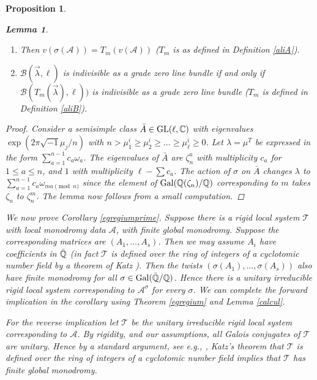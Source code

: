 \documentclass[11pt]{amsart}
\newcommand\op{\operatorname}
\newcommand\rigid{\mathcal{T}}
\newtheorem{proposition}[theorem]{Proposition}
\newtheorem{lemma}[theorem]{Lemma}
\numberwithin{theorem}{subsection}
\begin{document}
{\begin{proposition}
\begin{lemma}
\begin{enumerate}
\item Then $v(\sigma(\mathcal{A}))= T_m(v(\mathcal{A}))$ ($T_m$ is as defined in Definition  \ref{aliA}).
\item  $\mathcal{B}(\vec{\lambda},\ell)$ is indivisible as a grade zero line bundle if and only if
$\mathcal{B}(T_m(\vec{\lambda}),\ell))$ is indivisible as a grade zero line bundle ($T_m$ is  defined in Definition  \ref{aliB}).
\end{enumerate}
\end{lemma}
\begin{proof}
Consider a  semisimple class $\bar{A}\in \op{GL}(\ell,\Bbb{C})$ with eigenvalues $\exp(2\pi\sqrt{-1}\mu_j/n)$ with $n>\mu^i_1\geq \mu^i_2\geq \dots \geq \mu^i_{\ell}\geq 0$. Let $\lambda=\mu^T$ be expressed in the form $\sum_{a=1}^{n-1} c_a\omega_a$. The eigenvalues of $\bar{A}$ are $\zeta_n^a$ with multiplicity  $c_a$  for $1\leq a \leq n$, and $1$ with multiplicity $\ell-\sum c_a$. The action of $\sigma$ on $\bar{A}$ changes $\lambda$ to $\sum_{a=1}^{n-1} c_a\omega_{ma \pmod n}$ since the element of $\op{Gal}(\Bbb{Q}(\zeta_n)/\Bbb{Q})$ corresponding to $m$ takes $\zeta_n$ to $\zeta_n^m$.
The lemma now follows from a small computation.
\end{proof}
We now prove Corollary \ref{egregiumprime}. Suppose there is a rigid local system $\rigid$  with local monodromy data $\mathcal{A}$, with finite global monodromy. Suppose the corresponding matrices are $(A_1,\dots,A_s)$. Then we may assume
$A_i$ have coefficients in $\bar{\Bbb{Q}}$ (in fact $\rigid$ is defined over the ring of integers of a cyclotomic
number field by a theorem of Katz \cite{Katz}). Then the twists $(\sigma(A_1),\dots,\sigma(A_s))$ also have finite monodromy for all $\sigma\in \op{Gal}(\bar{\Bbb{Q}}/\Bbb{Q})$. Hence there is a unitary irreducible rigid local system corresponding to $\mathcal{A}^{\sigma}$ for every $\sigma$. We can complete the forward implication in the corollary using Theorem \ref{egregium} and Lemma \ref{calcul}.

For the reverse implication let $\rigid$ be the unitary irreducible rigid local system corresponding to $\mathcal{A}$. By rigidity, and our assumptions,  all Galois conjugates of $\rigid$ are unitary. Hence by a standard argument, see e.g., \cite[Theorem 11]{BLocal}, Katz's theorem that $\rigid$ is
defined over the ring of integers of a cyclotomic number field implies that $\rigid$ has finite global monodromy.

\end{proposition}}
\end{document}
